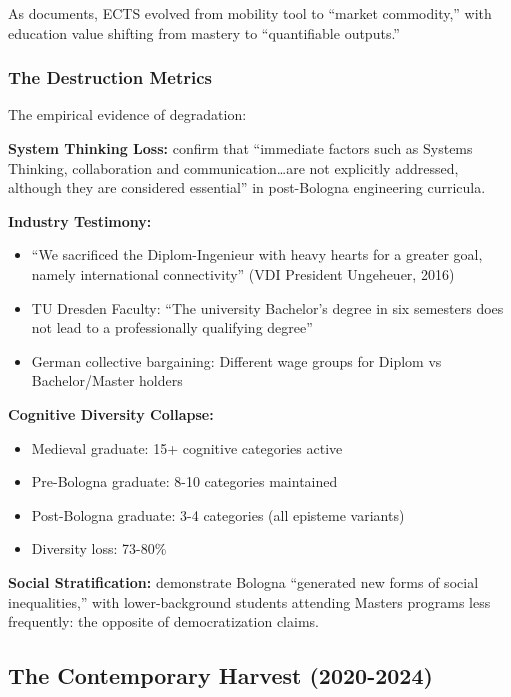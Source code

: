As \citet{gleeson2021} documents, ECTS evolved from mobility tool to ``market commodity,'' with education value shifting from mastery to ``quantifiable outputs.''

\subsubsection{The Destruction Metrics}

The empirical evidence of degradation:

\textbf{System Thinking Loss:} \citet{kaiser2022} confirm that ``immediate factors such as Systems Thinking, collaboration and communication\ldots are not explicitly addressed, although they are considered essential'' in post-Bologna engineering curricula.

\textbf{Industry Testimony:}
\begin{itemize}
\item ``We sacrificed the Diplom-Ingenieur with heavy hearts for a greater goal, namely international connectivity'' (VDI President Ungeheuer, 2016)
\item TU Dresden Faculty: ``The university Bachelor's degree in six semesters does not lead to a professionally qualifying degree'' \citep{odenbach2015}
\item German collective bargaining: Different wage groups for Diplom vs Bachelor/Master holders \citep{wieschke2020}
\end{itemize}

\textbf{Cognitive Diversity Collapse:}
\begin{itemize}
\item Medieval graduate: 15+ cognitive categories active
\item Pre-Bologna graduate: 8-10 categories maintained
\item Post-Bologna graduate: 3-4 categories (all episteme variants)
\item Diversity loss: 73-80\%
\end{itemize}

\textbf{Social Stratification:} \citet{kroher2021} demonstrate Bologna ``generated new forms of social inequalities,'' with lower-background students attending Masters programs less frequently: the opposite of democratization claims.

\subsection{The Contemporary Harvest (2020-2024)}

